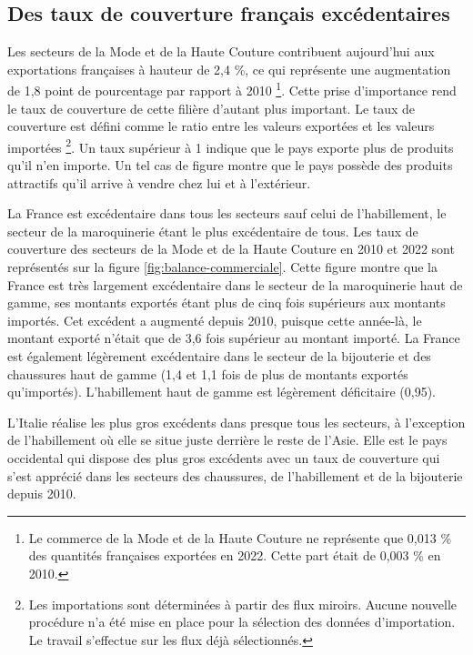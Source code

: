\documentclass[french,10pt,a4paper]{article}
\begin{document}
\subsection{Des taux de couverture français excédentaires}
Les secteurs de la Mode et de la Haute Couture contribuent aujourd'hui aux exportations françaises à hauteur de 2,4 \%, ce qui représente une augmentation de 1,8 point de pourcentage par rapport à 2010 \footnote{Le commerce de la Mode et de la Haute Couture ne représente que 0,013 \% des quantités françaises exportées en 2022. Cette part était de 0,003 \% en 2010.}. Cette prise d'importance rend le taux de couverture de cette filière d'autant plus important. Le taux de couverture est défini comme le ratio entre les valeurs exportées et les valeurs importées \footnote{Les importations sont déterminées à partir des flux miroirs. Aucune nouvelle procédure n'a été mise en place pour la sélection des données d'importation. Le travail s'effectue sur les flux déjà sélectionnés.}. Un taux supérieur à 1 indique que le pays exporte plus de produits qu'il n'en importe. Un tel cas de figure montre que le pays possède des produits attractifs qu'il arrive à vendre chez lui et à l'extérieur.

\bigskip

La France est excédentaire dans tous les secteurs sauf celui de l'habillement, le secteur de la maroquinerie étant le plus excédentaire de tous. Les taux de couverture des secteurs de la Mode et de la Haute Couture en 2010 et 2022 sont représentés sur la figure \ref{fig:balance-commerciale}. Cette figure montre que la France est très largement excédentaire dans le secteur de la maroquinerie haut de gamme, ses montants exportés étant plus de cinq fois supérieurs aux montants importés. Cet excédent a augmenté depuis 2010, puisque cette année-là, le montant exporté n'était que de 3,6 fois supérieur au montant importé. La France est également légèrement excédentaire dans le secteur de la bijouterie et des chaussures haut de gamme (1,4 et 1,1 fois de plus de montants exportés qu'importés). L'habillement haut de gamme est légèrement déficitaire (0,95).

L'Italie réalise les plus gros excédents dans presque tous les secteurs, à l'exception de l'habillement où elle se situe juste derrière le reste de l'Asie. Elle est le pays occidental qui dispose des plus gros excédents avec un taux de couverture qui s'est apprécié dans les secteurs des chaussures, de l'habillement et de la bijouterie depuis 2010.
\end{document}
